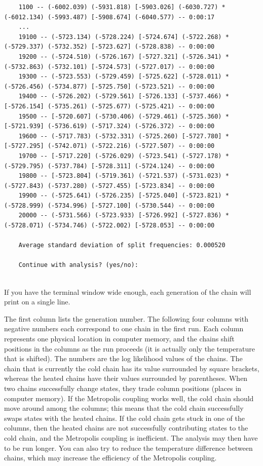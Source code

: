 \documentclass[12pt]{book}
\begin{document}
\begin{singlespacing}
\begin{verbatim}
    1100 -- (-6002.039) (-5931.818) [-5903.026] (-6030.727) * (-6012.134) (-5993.487) [-5908.674] (-6040.577) -- 0:00:17
    ...
    19100 -- (-5723.134) (-5728.224) [-5724.674] (-5722.268) * (-5729.337) (-5732.352) [-5723.627] (-5728.838) -- 0:00:00
    19200 -- (-5724.510) (-5726.167) [-5727.321] (-5726.341) * (-5732.863) (-5732.101) [-5724.573] (-5727.017) -- 0:00:00
    19300 -- (-5723.553) (-5729.459) [-5725.622] (-5728.011) * (-5726.456) (-5734.877) [-5725.750] (-5723.521) -- 0:00:00
    19400 -- (-5726.202) (-5729.561) [-5726.133] (-5737.466) * [-5726.154] (-5735.261) (-5725.677) (-5725.421) -- 0:00:00
    19500 -- [-5720.607] (-5730.406) (-5729.461) (-5725.360) * [-5721.939] (-5736.619) (-5717.324) (-5726.372) -- 0:00:00
    19600 -- (-5717.783) (-5732.331) (-5725.260) [-5727.780] * [-5727.295] (-5742.071) (-5722.216) (-5727.507) -- 0:00:00
    19700 -- [-5717.220] (-5726.029) (-5723.541) (-5727.178) * (-5729.795) (-5737.784) [-5728.311] (-5724.124) -- 0:00:00
    19800 -- [-5723.804] (-5719.361) (-5721.537) (-5731.023) * (-5727.843) (-5737.280) (-5727.455) [-5723.834] -- 0:00:00
    19900 -- (-5725.641) (-5726.235) [-5725.040] (-5723.821) * (-5728.999) (-5734.996) [-5727.100] (-5730.544) -- 0:00:00
    20000 -- (-5731.566) (-5723.933) [-5726.992] (-5727.836) * (-5728.071) (-5734.746) (-5722.002) [-5728.053] -- 0:00:00
 
    Average standard deviation of split frequencies: 0.000520
 
    Continue with analysis? (yes/no): 
  
\end{verbatim}
\normalsize
\end{singlespacing}

If you have the terminal window wide enough, each generation of the chain will print on a single line.

The first column lists the generation number. The following four columns with negative numbers each 
correspond to one chain in the first run. Each column represents one physical location in computer memory, 
and the chains shift positions in the columns as the run proceeds (it is actually only the temperature that 
is shifted). The numbers are the log likelihood values of the chains. The chain that is currently the cold 
chain has its value surrounded by square brackets, whereas the heated chains have their values surrounded by 
parentheses. When two chains successfully change states, they trade column positions (places in computer 
memory). If the Metropolis coupling works well, the cold chain should move around among the columns; this 
means that the cold chain successfully swaps states with the heated chains. If the cold chain gets stuck in 
one of the columns, then the heated chains are not successfully contributing states to the cold chain, and 
the Metropolis coupling is inefficient. The analysis may then have to be run longer. You can also try to 
reduce the temperature difference between chains, which may increase the efficiency of the Metropolis 
coupling.
\end{document}
